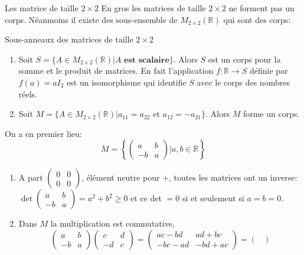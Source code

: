 \begin{parag}{Les matrice de taille $2 \times 2$}
    En gros les matrices de taille $2 \times 2$ ne forment pas un corps. Néanmoins il existe des sous-ensemble de $M_{2\times 2}(\mathbb{R})$ qui sont des corps:
    
\end{parag}
\begin{parag}{Sous-anneaux des matrices de taille $2 \times 2$}
    \begin{enumerate}
        \item Soit $S = \{A \in M_{2\times 2}(\mathbb{R})| A \textbf{ est scalaire}\}$. Alors $S$ est un corps pour la somme et le produit de matrices. En fait l'application $f: \mathbb{R} \to S$ définie par $f(a) = aI_2$ est un isomorphisme qui identifie $S$ avec le corps des nombres réels.
        \item Soit $M = \{A \in M_{2\times 2}(\mathbb{R})| a_{11} = a_{22} \text{ et } a_{12} = -a_{21}\}$. Alors $M$ forme un corps.
    \end{enumerate}
    On a en premier lieu:
    \[M = \left\{\begin{pmatrix}
        a & b \\ -b & a
    \end{pmatrix}| a, b \in \mathbb{R}\right\}\]
    \begin{enumerate}
        \item A part $\begin{pmatrix}
            0 & 0 \\ 0 & 0
        \end{pmatrix}$, élément neutre pour $+$, toutes les matrices ont un inverse: $\det \begin{pmatrix}
            a & b\\ -b & a
        \end{pmatrix} = a^2 + b^2 \geq 0$ et ce det $= 0$ si et seulement si $a = b = 0$.
        \item Dans $M$ la multiplication est commutative, 
        \[\begin{pmatrix}
            a & b \\ -b & a
        \end{pmatrix}\begin{pmatrix}
            c & d \\ -d & c
        \end{pmatrix} = \begin{pmatrix}
            ac - bd & ad + bc \\ -bc- ad & -bd + ac
        \end{pmatrix} = \begin{pmatrix}

\end{pmatrix}\]
\end{enumerate}
\end{parag}
